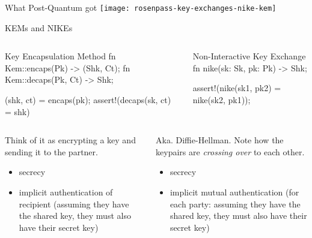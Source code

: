 \begin{frame}{What Post-Quantum got}
  \texttt{[image: rosenpass-key-exchanges-nike-kem]}
\end{frame}



\begin{frame}[fragile,T]{KEMs and NIKEs}
\small
  \begin{columns}[t,fullwidth]
\hfill
    \begin{column}{.47\linewidth}
\begin{rustblock}{Key Encapsulation Method}
fn Kem::encaps(Pk) -> (Shk, Ct);
fn Kem::decaps(Pk, Ct) -> Shk;

(shk, ct) = encaps(pk);
assert!(decaps(sk, ct) = shk)
\end{rustblock}
\end{column}
\begin{column}{.47\linewidth}
\begin{rustblock}{Non-Interactive Key Exchange}
fn nike(sk: Sk, pk: Pk) -> Shk;

assert!(nike(sk1, pk2) =
        nike(sk2, pk1));
\end{rustblock}
\end{column}\hfill
\end{columns}
\begin{columns}[t,fullwidth]
\hfill
\begin{column}{.47\linewidth}
  Think of it as encrypting a key and sending it
        to the partner.

        \begin{itemize}
          \item secrecy
          \item implicit authentication of recipient
            (assuming they have the shared key, they must
            also have their secret key)
        \end{itemize}
\end{column}
\begin{column}{.47\linewidth}
        Aka. Diffie-Hellman. Note how the
        keypairs are \emph{crossing over} to each other.

        \begin{itemize}
          \item secrecy
          \item implicit mutual authentication
            (for each party: assuming they have the shared key, they must
            also have their secret key)
        \end{itemize}
    \end{column}
    \hfill\strut
  \end{columns}
\end{frame}


